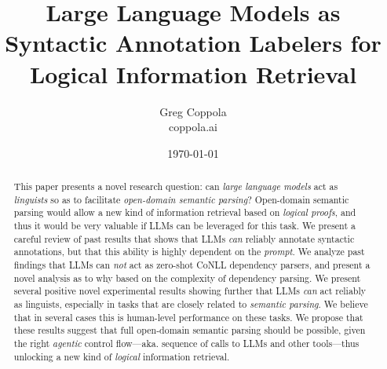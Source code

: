 \documentclass[11pt]{article}
\title{Large Language Models as Syntactic Annotation Labelers for Logical Information Retrieval}
\author{Greg Coppola\\coppola.ai}
\date{\today}
\begin{document}
\maketitle

\begin{abstract}
    This paper presents a novel research question: can {\em large language models} act as {\em linguists} so as to facilitate {\em open-domain semantic parsing}?
    Open-domain semantic parsing would allow a new kind of information retrieval based on {\em logical proofs}, and thus it would be very valuable if LLMs can be leveraged for this task.
    We present a careful review of past results that shows that LLMs {\em can} reliably annotate syntactic annotations, but that this ability is highly dependent on the {\em prompt}.
    We analyze past findings that LLMs can {\em not} act as zero-shot CoNLL dependency parsers, and present a novel analysis as to why based on the complexity of dependency parsing.
    We present several positive novel experimental results showing further that LLMs {\em can} act reliably as linguists, especially in tasks that are closely related to {\em semantic parsing}.
    We believe that in several cases this is human-level performance on these tasks.
    We propose that these results suggest that full open-domain semantic parsing should be possible, given the right {\em agentic} control flow---aka. sequence of calls to LLMs and other tools---thus unlocking a new kind of {\em logical} information retrieval.
\end{abstract}
\end{document}
